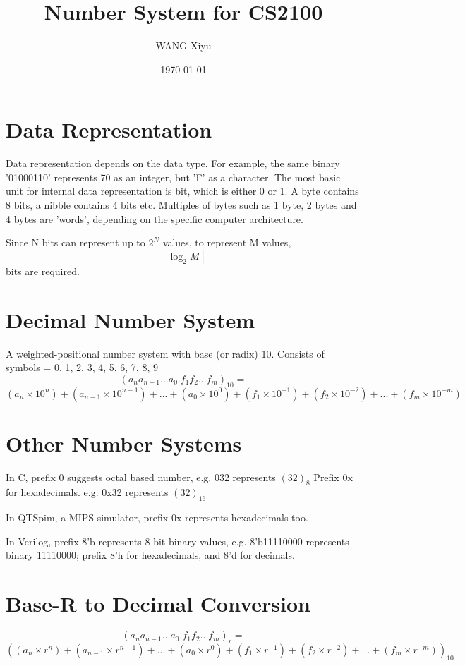 \documentclass[12pt]{article} %
\title{Number System for CS2100}
\author{WANG Xiyu}
\date{\today}
\begin{document}
\maketitle

\tableofcontents %

\section{Data Representation}
Data representation depends on the data type.
For example, the same binary '01000110' represents 70 as an integer, but 'F' as a character.
The most basic unit for internal data representation is bit, which is either 0 or 1.
A byte contains 8 bits, a nibble contains 4 bits etc.
Multiples of bytes such as 1 byte, 2 bytes and 4 bytes are 'words', depending on the specific computer architecture.

Since N bits can represent up to \(2^N\) values, to represent M values,
\[\left\lceil \log_2M \right\rceil\]
bits are required.

\section{Decimal Number System}
A weighted-positional number system with base (or radix) 10.
Consists of symbols = {0, 1, 2, 3, 4, 5, 6, 7, 8, 9}
\[(a_na_{n-1}...a_0.f_1f_2...f_m)_{10}= \]\[ (a_n \times 10^n) + (a_{n-1} \times 10^{n-1}) + ... + (a_0 \times 10^0) + (f_1 \times 10^{-1}) + (f_2 \times 10^{-2}) + ... + (f_m \times 10^{-m}) \] 

\section{Other Number Systems}
In C, prefix 0 suggests octal based number, e.g. 032 represents \((32)_8\)
Prefix 0x for hexadecimals. e.g. 0x32 represents \((32)_16\)

In QTSpim, a MIPS simulator, prefix 0x represents hexadecimals too.

In Verilog, prefix 8'b represents 8-bit binary values, e.g. 8'b11110000 represents binary 11110000;
prefix 8'h for hexadecimals, and 8'd for decimals.

\section*{Base-R to Decimal Conversion}
\[(a_na_{n-1}...a_0.f_1f_2...f_m)_{r}= \]\[ ((a_n \times r^n) + (a_{n-1} \times r^{n-1}) + ... + (a_0 \times r^0) + (f_1 \times r^{-1}) + (f_2 \times r^{-2}) + ... + (f_m \times r^{-m}))_{10} \] 
\end{document}
